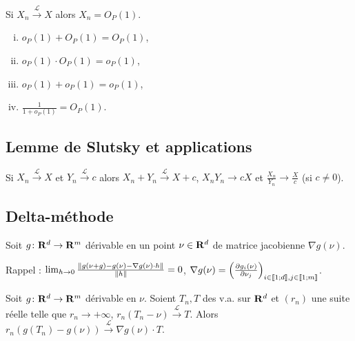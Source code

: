 	\begin{pop}
		Si $X_n \overset{\mathcal{L}}{\longrightarrow} X$ alors $X_n = O_P(1)$.
	\end{pop}

	\begin{pop}
		\begin{enumerate}[(i)]
			\item $o_P(1) + O_P(1) = O_P(1)$,
			\item $o_P(1) \cdot O_P(1) = o_P(1)$,
			\item $o_P(1) + o_P(1) = o_P(1)$,
			\item $\frac{1}{1 + o_P(1)} = O_P(1)$.
		\end{enumerate}
	\end{pop}


\subsection{Lemme de Slutsky et applications}

	\begin{lem}[de Slutsky]
		Si $X_n \overset{\mathcal{L}}{\longrightarrow} X$ et $Y_n \overset{\mathcal{L}}{\longrightarrow} c$ alors $X_n + Y_n \overset{\mathcal{L}}{\longrightarrow} X + c$, $X_n Y_n \longrightarrow cX$ et $\frac{X_n}{Y_n} \longrightarrow \frac{X}{c}$ (si $c \neq 0$).
	\end{lem}


\subsection{Delta-méthode}

	Soit $g \colon \mathbf{R}^d \to \mathbf{R}^m$ dérivable en un point $\nu \in \mathbf{R}^d$ de matrice jacobienne $\nabla g(\nu)$.
	
	Rappel : $\lim_{h \to 0} \frac{\left\lVert g(\nu + g) - g(\nu) - \nabla g(\nu) \cdot h\right\rVert}{\left\lVert h\right\rVert} = 0$, $\nabla g(\nu) = \left( \frac{\partial g_i(\nu)}{\partial \nu_j} \right)_{i \in \mathopen{}\mathclose{\left[\![1\mathclose{}\mathpunct{};d\right]\!]}, j \in \mathopen{}\mathclose{\left[\![1\mathclose{}\mathpunct{};m\right]\!]}}$.

	\begin{thm}
		Soit $g \colon \mathbf{R}^d \to \mathbf{R}^m$ dérivable en $\nu$.
		Soient $T_n, T$ des v.a. sur $\mathbf{R}^d$ et $(r_n)$ une suite réelle telle que $r_n \longrightarrow +\infty$, $r_n(T_n - \nu) \overset{\mathcal{L}}{\longrightarrow} T$.
		Alors $r_n(g(T_n) - g(\nu)) \overset{\mathcal{L}}{\longrightarrow} \nabla g(\nu) \cdot T$.
	\end{thm}

